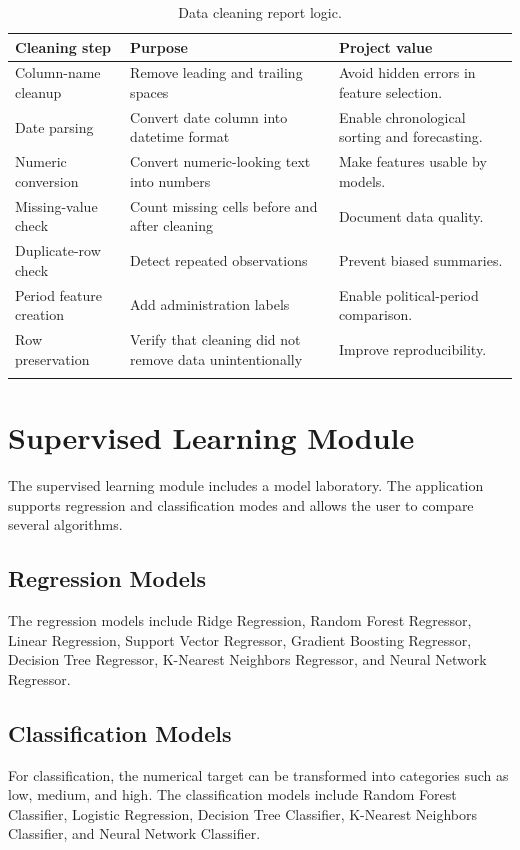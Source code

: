 \begin{longtable}{p{4cm}p{5cm}p{5cm}}
\toprule
\textbf{Cleaning step} & \textbf{Purpose} & \textbf{Project value} \\
\midrule
Column-name cleanup & Remove leading and trailing spaces & Avoid hidden errors in feature selection. \\
Date parsing & Convert date column into datetime format & Enable chronological sorting and forecasting. \\
Numeric conversion & Convert numeric-looking text into numbers & Make features usable by models. \\
Missing-value check & Count missing cells before and after cleaning & Document data quality. \\
Duplicate-row check & Detect repeated observations & Prevent biased summaries. \\
Period feature creation & Add administration labels & Enable political-period comparison. \\
Row preservation & Verify that cleaning did not remove data unintentionally & Improve reproducibility. \\
\bottomrule
\caption{Data cleaning report logic.}
\end{longtable}

\section{Supervised Learning Module}

The supervised learning module includes a model laboratory. The application supports regression and classification modes and allows the user to compare several algorithms.

\subsection{Regression Models}

The regression models include Ridge Regression, Random Forest Regressor, Linear Regression, Support Vector Regressor, Gradient Boosting Regressor, Decision Tree Regressor, K-Nearest Neighbors Regressor, and Neural Network Regressor.

\subsection{Classification Models}

For classification, the numerical target can be transformed into categories such as low, medium, and high. The classification models include Random Forest Classifier, Logistic Regression, Decision Tree Classifier, K-Nearest Neighbors Classifier, and Neural Network Classifier.

